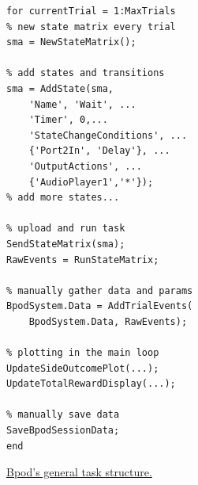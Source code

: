 \documentclass[nohyper, justified, notitlepage, marginals=raggedright,twoside=false,debug]{tufte-autopilot}
\begin{document}
\begin{marginfigure}[0.35cm]
\begin{verbatim}
for currentTrial = 1:MaxTrials
% new state matrix every trial
sma = NewStateMatrix();

% add states and transitions
sma = AddState(sma, 
    'Name', 'Wait', ...
    'Timer', 0,...
    'StateChangeConditions', ...
    {'Port2In', 'Delay'}, ...
    'OutputActions', ...
    {'AudioPlayer1','*'});
% add more states...

% upload and run task
SendStateMatrix(sma);
RawEvents = RunStateMatrix;

% manually gather data and params
BpodSystem.Data = AddTrialEvents(
    BpodSystem.Data, RawEvents);
    
% plotting in the main loop
UpdateSideOutcomePlot(...);
UpdateTotalRewardDisplay(...);

% manually save data
SaveBpodSessionData;
end
\end{verbatim}
\caption{\href{https://github.com/sanworks/Bpod_Gen2/blob/master/Examples/Protocols/AnalogSound2AFC/AnalogSound2AFC.m}{Bpod's general task structure.}}
\label{fig:bpodtask}
\end{marginfigure}\nobreak
\end{document}
